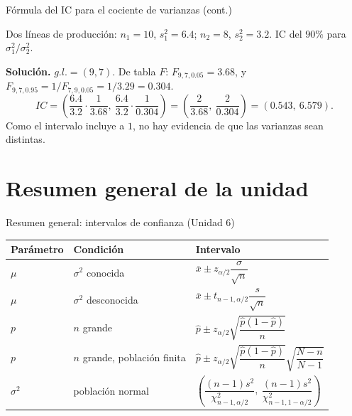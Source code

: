 \documentclass[aspectratio=169,11pt]{beamer}
\begin{document}
\begin{frame}{Fórmula del IC para el cociente de varianzas (cont.)}
\begin{example}
Dos líneas de producción: $n_1=10$, $s_1^2=6.4$; $n_2=8$, $s_2^2=3.2$. IC del $90\%$ para $\sigma_1^2/\sigma_2^2$.

\textbf{Solución.} $g.l.=(9,7)$. De tabla $F$: $F_{9,7,0.05}=3.68$, y $F_{9,7,0.95}=1/F_{7,9,0.05}=1/3.29=0.304$.
\[
IC = \left(\frac{6.4}{3.2}\cdot\frac{1}{3.68},\ \frac{6.4}{3.2}\cdot\frac{1}{0.304}\right) = \left(\frac{2}{3.68},\ \frac{2}{0.304}\right) = (0.543,\ 6.579).
\]
Como el intervalo incluye a $1$, no hay evidencia de que las varianzas sean distintas.
\end{example}
\end{frame}

\section{Resumen general de la unidad}

\begin{frame}{Resumen general: intervalos de confianza (Unidad 6)}
\begin{center}
\footnotesize
\begin{tabular}{lll}
\toprule
\textbf{Parámetro} & \textbf{Condición} & \textbf{Intervalo} \\
\midrule
$\mu$ & $\sigma^2$ conocida & $\overline x \pm z_{\alpha/2}\dfrac{\sigma}{\sqrt n}$ \\[1ex]
$\mu$ & $\sigma^2$ desconocida & $\overline x \pm t_{n-1,\alpha/2}\dfrac{s}{\sqrt n}$ \\[1ex]
$p$ & $n$ grande & $\widehat p \pm z_{\alpha/2}\sqrt{\dfrac{\widehat p(1-\widehat p)}{n}}$ \\[1ex]
$p$ & $n$ grande, población finita & $\widehat p \pm z_{\alpha/2}\sqrt{\dfrac{\widehat p(1-\widehat p)}{n}}\sqrt{\dfrac{N-n}{N-1}}$ \\[1.5ex]
$\sigma^2$ & población normal & $\left(\dfrac{(n-1)s^2}{\chi^2_{n-1,\alpha/2}},\ \dfrac{(n-1)s^2}{\chi^2_{n-1,1-\alpha/2}}\right)$ \\
\bottomrule
\end{tabular}
\end{center}
\end{frame}
\end{document}
